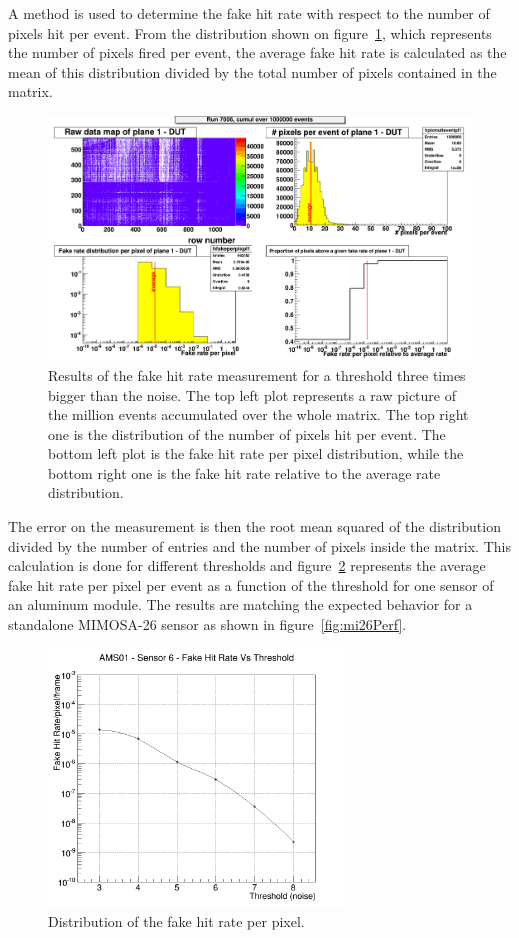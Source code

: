   A method is used to determine the fake hit rate with respect to the number of pixels hit per event.
  From the distribution shown on figure~\ref{fig:pixel/event}, which represents the number of pixels fired per event, the average fake hit rate is calculated as the mean of this distribution divided by the total number of pixels contained in the matrix.
    \begin{figure}
    \centering
    \includegraphics[width = \textwidth]{Pictures/labTests/FHR_AS01_chip3.png}
    \caption{Results of the fake hit rate measurement for a threshold three times bigger than the noise. The top left plot represents a raw picture of the million events accumulated over the whole matrix. The top right one is the distribution of the number of pixels hit per event. The bottom left plot is the fake hit rate per pixel distribution, while the bottom right one is the fake hit rate relative to the average rate distribution.}
    \label{fig:pixel/event}
  \end{figure}
  The error on the measurement is then the root mean squared of the distribution divided by the number of entries and the number of pixels inside the matrix.
  This calculation is done for different thresholds and figure~\ref{fig:FHR} represents the average fake hit rate per pixel per event as a function of the threshold for one sensor of an aluminum module.
  The results are matching the expected behavior for a standalone MIMOSA-26 sensor as shown in figure~\ref{fig:mi26Perf}.

  \begin{figure}
    \centering
    \includegraphics[width=0.7\textwidth]{Pictures/labTests/fake_sensor6.png}
    \caption{Distribution of the fake hit rate per pixel.}
    \label{fig:FHR}
  \end{figure}

